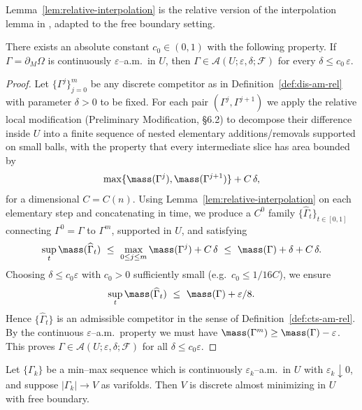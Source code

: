 \begin{remark}
Lemma~\ref{lem:relative-interpolation} is the relative version of the interpolation lemma in \cite[Lemma~B.1]{LZ17}, adapted to the free boundary setting.
\end{remark}

\begin{proposition}\label{prop:cts-to-dis}
There exists an absolute constant $c_0\in(0,1)$ with the following property.
If $\Gamma=\partial_M\Omega$ is continuously $\varepsilon$–a.m.\ in $U$,
then $\Gamma\in\mathscr A(U;\varepsilon,\delta;\mathcal F)$ for every
$\delta\le c_0\,\varepsilon$.
\end{proposition}

\begin{proof}
Let $\{\Gamma^j\}_{j=0}^m$ be any discrete competitor as in Definition~\ref{def:dis-am-rel}
with parameter $\delta>0$ to be fixed.
For each pair $(\Gamma^j,\Gamma^{j+1})$ we apply the relative local modification
(Preliminary Modification, §6.2) to decompose their difference inside $U$ into a finite sequence of
nested elementary additions/removals supported on small balls, with the property that every
intermediate slice has area bounded by
\[
\max\{\mass(\Gamma^j),\mass(\Gamma^{j+1})\}+C\,\delta,
\]
for a dimensional $C=C(n)$.
Using Lemma~\ref{lem:relative-interpolation} on each elementary step and concatenating in time,
we produce a $C^0$ family $\{\widehat\Gamma_t\}_{t\in[0,1]}$ connecting $\Gamma^0=\Gamma$ to
$\Gamma^m$, supported in $U$, and satisfying
\[
\sup_t\mass(\widehat\Gamma_t)\ \le\ \max_{0\le j\le m}\mass(\Gamma^j)+C\,\delta
\ \le\ \mass(\Gamma)+\delta+C\,\delta.
\]
Choosing $\delta\le c_0\varepsilon$ with $c_0>0$ sufficiently small (e.g.\ $c_0\le 1/16C$),
we ensure
\[
\sup_t\mass(\widehat\Gamma_t)\ \le\ \mass(\Gamma)+\varepsilon/8.
\]
Hence $\{\widehat\Gamma_t\}$ is an admissible competitor in the sense of
Definition~\ref{def:cts-am-rel}. By the continuous $\varepsilon$–a.m.\ property we must have
\(\mass(\Gamma^m)\ge \mass(\Gamma)-\varepsilon\).
This proves $\Gamma\in \mathscr{A}(U;\varepsilon,\delta;\mathcal F)$ for all $\delta\le c_0\varepsilon$.
\end{proof}

\begin{corollary}\label{cor:dis-am-limit}
Let $\{\Gamma_k\}$ be a min–max sequence which is continuously $\varepsilon_k$–a.m.\ in $U$
with $\varepsilon_k\downarrow 0$, and suppose $|\Gamma_k|\to V$ as varifolds.
Then $V$ is discrete almost minimizing in $U$ with free boundary.
\end{corollary}

